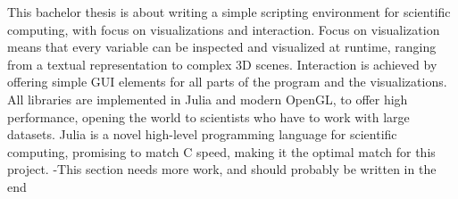 This bachelor thesis is about writing a simple scripting environment for scientific computing, with focus on visualizations and interaction.
Focus on visualization means that every variable can be inspected and visualized at runtime, ranging from a textual representation to complex 3D scenes.
Interaction is achieved by offering simple GUI elements for all parts of the program and the visualizations.
All libraries are implemented in Julia and modern OpenGL, to offer high performance, opening the world to scientists who have to work with large datasets.
Julia is a novel high-level programming language for scientific computing, promising to match C speed, making it the optimal match for this project.
-This section needs more work, and should probably be written in the end